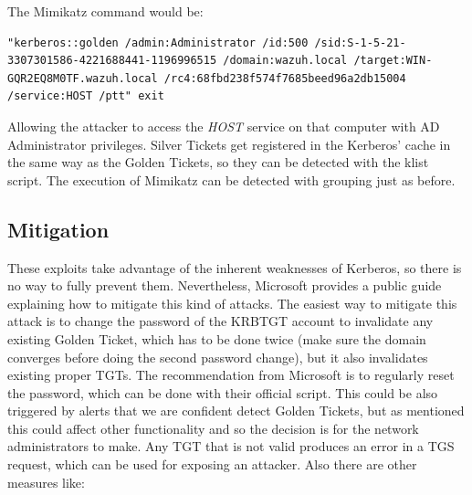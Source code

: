 The Mimikatz command would be:
\begin{lstlisting}[style=PS,numbers=none]
"kerberos::golden /admin:Administrator /id:500 /sid:S-1-5-21-3307301586-4221688441-1196996515 /domain:wazuh.local /target:WIN-GQR2EQ8M0TF.wazuh.local /rc4:68fbd238f574f7685beed96a2db15004 /service:HOST /ptt" exit
\end{lstlisting}
Allowing the attacker to access the \textit{HOST} service on that computer with AD Administrator privileges.
\linej
\linej
Silver Tickets get registered in the Kerberos' cache in the same way as the Golden Tickets, so they can be detected with the klist script. The execution of Mimikatz can be detected with grouping just as before.

\subsection{Mitigation}
These exploits take advantage of the inherent weaknesses of Kerberos, so there is no way to fully prevent them. Nevertheless, Microsoft provides a public guide explaining how to mitigate this kind of attacks\cite{microsoft_mitigation}.
The easiest way to mitigate this attack is to change the password of the KRBTGT account to invalidate any existing Golden Ticket, which has to be done twice (make sure the domain converges before doing the second password change\cite{hood}), but it also invalidates existing proper TGTs.
\linej
The recommendation from Microsoft is to regularly reset the password\cite{tarlogic_comprehension}\cite{adsecurity_483}, which can be done with their official script\cite{reset_script}. This could be also triggered by alerts that we are confident detect Golden Tickets, but as mentioned this could affect other functionality and so the decision is for the network administrators to make. Any TGT that is not valid produces an error in a TGS request, which can be used for exposing an attacker\cite{scom_GT}.
\linej
\linej
Also there are other measures like:
